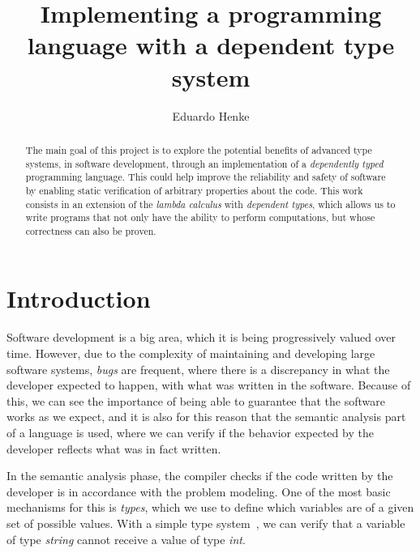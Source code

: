 \documentclass[12pt]{article}
\title{Implementing a programming language with a dependent type system}
\author{Eduardo Henke\inst{1}}
\theoremstyle{definition}
\begin{document}
 

\maketitle

\begin{abstract}
  The main goal of this project is to explore the potential benefits of advanced type systems, in software development, through an implementation of a \emph{dependently typed} programming language.
  This could help improve the reliability and safety of software by enabling static verification of arbitrary properties about the code.
  This work consists in an extension of the \emph{lambda calculus} with \emph{dependent types}, which allows us to write programs that not only have the ability to perform computations, but whose correctness can also be proven.
\end{abstract}

\section{Introduction}

Software development is a big area, which it is being progressively valued over time.
However, due to the complexity of maintaining and developing large software systems, \textit{bugs} are frequent, where there is a discrepancy in what the developer expected to happen, with what was written in the software.
Because of this, we can see the importance of being able to guarantee that the software works as we expect, and it is also for this reason that the semantic analysis part of a language is used, where we can verify if the behavior expected by the developer reflects what was in fact written.

In the semantic analysis phase, the compiler checks if the code written by the developer is in accordance with the problem modeling. One of the most basic mechanisms for this is \emph{types}, which we use to define which variables are of a given set of possible values. With a simple type system~\cite{tapl}, we can verify that a variable of type \emph{string} cannot receive a value of type \emph{int}.
\end{document}
